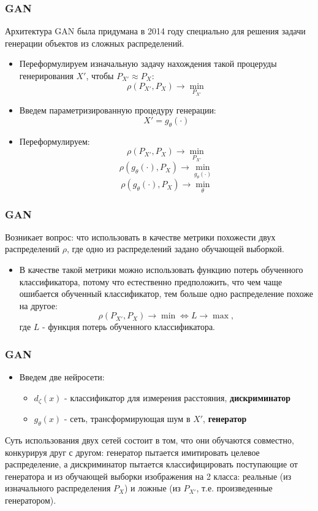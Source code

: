 \documentclass[12pt]{beamer}
\begin{document}
\begin{frame}\frametitle{GAN}
	Архитектура GAN была придумана в 2014 году специально для решения задачи генерации объектов из сложных распределений. \\
	\begin{itemize}
		\item Переформулируем изначальную задачу нахождения такой процеруды генерирования $X'$, чтобы $ P_{X'} \approx P_X$:
		$$ \rho(P_{X'}, P_X) \longrightarrow \underset{P_{X'}}{\min} $$
		\item Введем параметризированную процедуру генерации:
		$$ X' = g_{\theta}(\cdot) $$
		\item Переформулируем:
		$$ \rho(P_{X'}, P_X) \longrightarrow \underset{P_{X'}}{\min} $$
		$$ \rho(g_{\theta}(\cdot), P_X) \longrightarrow \underset{g_{\theta}(\cdot)}{\min} $$
		$$ \rho(g_{\theta}(\cdot), P_X) \longrightarrow \underset{\theta}{\min} $$
	\end{itemize}
	
\end{frame}

\begin{frame}\frametitle{GAN}
	Возникает вопрос: что использовать в качестве метрики похожести двух распределений $\rho$, где одно из распределений задано обучающей выборкой.
	\begin{itemize}
		\item В качестве такой метрики можно использовать функцию потерь обученного классификатора, потому что естественно предположить, что чем чаще ошибается обученный классификатор, тем больше одно распределение похоже на другое:
		$$ \rho(P_{X'}, P_X) \longrightarrow \min \Leftrightarrow L \longrightarrow \max, $$
		где $L$ - функция потерь обученного классификатора.
	\end{itemize}
\end{frame}

\begin{frame}\frametitle{GAN}
	\begin{itemize}
		\item Введем две нейросети:
		\begin{itemize}
			\item $d_{\zeta}(x)$ - классификатор для измерения расстояния, \textbf{дискриминатор}
			\item $g_{\theta}(x)$ - сеть, трансформирующая шум в $X'$, \textbf{генератор}
		\end{itemize}
	\end{itemize}
	Суть использования двух сетей состоит в том, что они обучаются совместно, конкурируя друг с другом: генератор пытается имитировать целевое распределение, а дискриминатор пытается классифицировать поступающие от генератора и из обучающей выборки изображения на 2 класса: реальные (из изначального распределения $P_X$) и ложные (из $P_{X'}$, т.е. произведенные генератором).
\end{frame}
\end{document}
